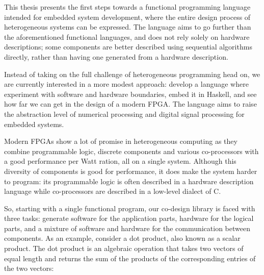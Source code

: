 \documentclass[../main.tex]{subfiles}
\begin{document}


This thesis presents the first steps towards a functional programming language intended for embedded system development, where the entire design process of heterogeneous systems can be expressed. The language aims to go further than the aforementioned functional languages, and does not rely solely on hardware descriptions; some components are better described using sequential algorithms directly, rather than having one generated from a hardware description.

Instead of taking on the full challenge of heterogeneous programming head on, we are currently interested in a more modest approach: develop a language where experiment with software and hardware boundaries, embed it in Haskell, and see how far we can get in the design of a modern FPGA. The language aims to raise the abstraction level of numerical processing and digital signal processing for embedded systems.

Modern FPGAs show a lot of promise in heterogeneous computing as they combine programmable logic, discrete components and various co-processors with a good performance per Watt ration, all on a single system. Although this diversity of components is good for performance, it does make the system harder to program: its programmable logic is often described in a hardware description language while co-processors are described in a low-level dialect of C.

So, starting with a single functional program, our co-design library is faced with three tasks: generate software for the application parts, hardware for the logical parts, and a mixture of software and hardware for the communication between components. As an example, consider a dot product, also known as a scalar product. The dot product is an algebraic operation that takes two vectors of equal length and returns the sum of the products of the corresponding entries of the two vectors:

\end{document}
